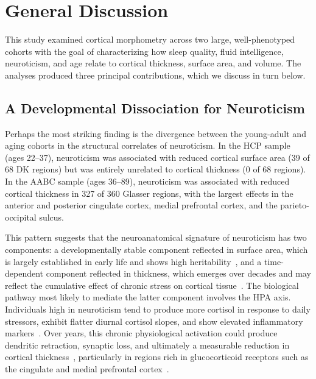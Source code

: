 
\section{General Discussion}
\label{sec:discussion}

This study examined cortical morphometry across two large, well-phenotyped cohorts with the goal of characterizing how sleep quality, fluid intelligence, neuroticism, and age relate to cortical thickness, surface area, and volume.
The analyses produced three principal contributions, which we discuss in turn below.

\subsection{A Developmental Dissociation for Neuroticism}

Perhaps the most striking finding is the divergence between the young-adult and aging cohorts in the structural correlates of neuroticism.
In the HCP sample (ages 22--37), neuroticism was associated with reduced cortical surface area (39 of 68 DK regions) but was entirely unrelated to cortical thickness (0 of 68 regions).
In the AABC sample (ages 36--89), neuroticism was associated with reduced cortical thickness in 327 of 360 Glasser regions, with the largest effects in the anterior and posterior cingulate cortex, medial prefrontal cortex, and the parieto-occipital sulcus.

This pattern suggests that the neuroanatomical signature of neuroticism has two components: a developmentally stable component reflected in surface area, which is largely established in early life and shows high heritability~\cite{grasby2020genetic}, and a time-dependent component reflected in thickness, which emerges over decades and may reflect the cumulative effect of chronic stress on cortical tissue~\cite{lupien2009effects, mcewen2006protective}.
The biological pathway most likely to mediate the latter component involves the HPA axis.
Individuals high in neuroticism tend to produce more cortisol in response to daily stressors, exhibit flatter diurnal cortisol slopes, and show elevated inflammatory markers~\cite{ottaviani2016physiological}.
Over years, this chronic physiological activation could produce dendritic retraction, synaptic loss, and ultimately a measurable reduction in cortical thickness~\cite{lupien2009effects}, particularly in regions rich in glucocorticoid receptors such as the cingulate and medial prefrontal cortex~\cite{mcewen2006protective}.

